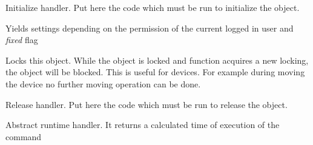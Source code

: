 \documentclass[letterpaper,10pt,english]{sphinxmanual}
\begin{document}
\begin{fulllineitems}
\begin{fulllineitems}
\label{command:pyfrid.core.command.BaseCommand.initialize}
Initialize handler. Put here the code which must be run to initialize the object.

\end{fulllineitems}


\begin{fulllineitems}
\label{command:pyfrid.core.command.BaseCommand.iterate_settings}
Yields settings depending on the permission of the current logged in user and \emph{fixed} flag

\end{fulllineitems}


\begin{fulllineitems}
\label{command:pyfrid.core.command.BaseCommand.lock}
Locks this object.
While the object is locked and function acquires a new locking, the object will be blocked.
This is useful for devices. For example during moving the device no further moving operation can be done.

\end{fulllineitems}


\begin{fulllineitems}
\label{command:pyfrid.core.command.BaseCommand.locked}
\end{fulllineitems}


\begin{fulllineitems}
\label{command:pyfrid.core.command.BaseCommand.release}
Release handler. Put here the code which must be run to release the object.

\end{fulllineitems}


\begin{fulllineitems}
\label{command:pyfrid.core.command.BaseCommand.runtime}
Abstract runtime handler. It returns a calculated time of execution of the command


\end{fulllineitems}
\end{fulllineitems}
\end{document}
